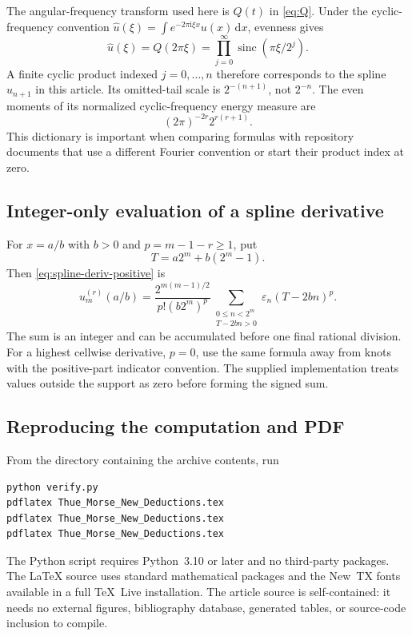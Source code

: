 \documentclass[11pt,a4paper]{article}
\numberwithin{equation}{section}
\theoremstyle{definition}
\newcommand{\eps}{\varepsilon}
\newcommand{\dd}{\,\mathrm d}
\newcommand{\ii}{\mathrm i}
\newcommand{\sinc}{\operatorname{sinc}}
\begin{document}
The angular-frequency transform used here is $Q(t)$ in
\eqref{eq:Q}. Under the cyclic-frequency convention
$\widehat u(\xi)=\int e^{-2\pi\ii\xi x}u(x)\dd x$, evenness gives
\begin{equation}
 \widehat u(\xi)=Q(2\pi\xi)
   =\prod_{j=0}^{\infty}\sinc(\pi\xi/2^j).
 \label{eq:cyclic-frequency}
\end{equation}
A finite cyclic product indexed $j=0,\ldots,n$ therefore corresponds
to the spline $u_{n+1}$ in this article. Its omitted-tail scale is
$2^{-(n+1)}$, not $2^{-n}$. The even moments of its normalized
cyclic-frequency energy measure are
\begin{equation}
 (2\pi)^{-2r}2^{r(r+1)}.
\end{equation}
This dictionary is important when comparing formulas with
repository documents that use a different Fourier convention or
start their product index at zero.

\subsection{Integer-only evaluation of a spline derivative}

For $x=a/b$ with $b>0$ and $p=m-1-r\geq1$, put
\begin{equation}
 T=a2^m+b(2^m-1).
\end{equation}
Then \eqref{eq:spline-deriv-positive} is
\begin{equation}
 u_m^{(r)}(a/b)
 =\frac{2^{m(m-1)/2}}{p!(b2^m)^p}
       \sum_{\substack{0\leq n<2^m\\T-2bn>0}}
           \eps_n(T-2bn)^p.
 \label{eq:integer-spline-evaluation}
\end{equation}
The sum is an integer and can be accumulated before one final
rational division. For a highest cellwise derivative, $p=0$,
use the same formula away from knots with the positive-part
indicator convention. The supplied implementation treats values
outside the support as zero before forming the signed sum.

\subsection{Reproducing the computation and PDF}

From the directory containing the archive contents, run
\begin{lstlisting}
python verify.py
pdflatex Thue_Morse_New_Deductions.tex
pdflatex Thue_Morse_New_Deductions.tex
pdflatex Thue_Morse_New_Deductions.tex
\end{lstlisting}
The Python script requires Python~3.10 or later and no third-party
packages. The LaTeX source uses standard mathematical packages and
the New~TX fonts available in a full TeX~Live installation. The
article source is self-contained: it needs no external figures,
bibliography database, generated tables, or source-code inclusion
to compile.
\end{document}
